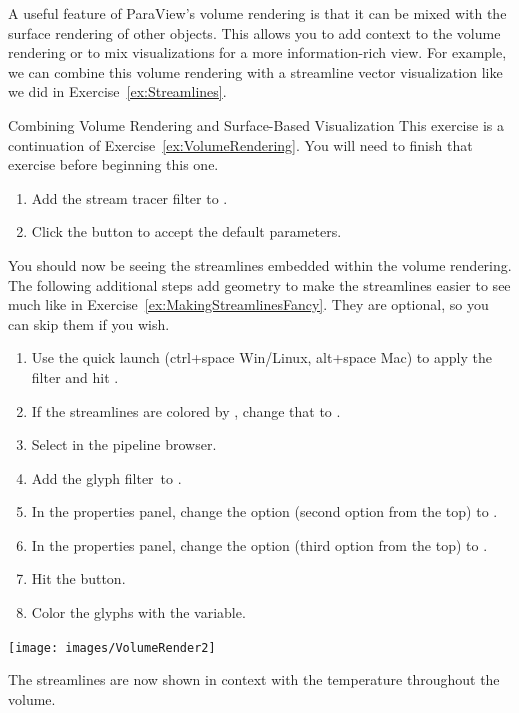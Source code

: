 A useful feature of ParaView's volume rendering is that it can be mixed
with the surface rendering of other objects.  This allows you to add
context to the volume rendering or to mix visualizations for a more
information-rich view.  For example, we can combine this volume rendering
with a streamline vector visualization like we did in
Exercise~\ref{ex:Streamlines}.

\begin{exercise}{Combining Volume Rendering and Surface-Based Visualization}
  \label{ex:CombiningVolumeAndSurfaceRendering}%
  This exercise is a continuation of Exercise~\ref{ex:VolumeRendering}.
  You will need to finish that exercise before beginning this one.

  \begin{enumerate}
  \item Add the stream tracer filter \streamTracer to
    .
  \item Click the \apply button to accept the default parameters.
    \savecounter
  \end{enumerate}

  You should now be seeing the streamlines embedded within the volume
  rendering.  The following additional steps add geometry to make the
  streamlines easier to see much like in
  Exercise~\ref{ex:MakingStreamlinesFancy}.  They are optional, so you can
  skip them if you wish.

  \begin{enumerate}
    \restorecounter
  \item Use the quick launch (ctrl+space Win/Linux, alt+space Mac) to apply
    the  filter and hit \apply.
  \item If the streamlines are colored by , change that to
    .
  \item Select  in the pipeline browser.
  \item Add the glyph filter~\glyph to .
  \item In the properties panel, change the  option (second
    option from the top) to .
  \item In the properties panel, change the  option (third
    option from the top) to .
  \item Hit the \apply button.
  \item Color the glyphs with the  variable.
  \end{enumerate}

  \begin{inlinefig}
    \texttt{[image: images/VolumeRender2]}
  \end{inlinefig}

  The streamlines are now shown in context with the temperature throughout
  the volume.
\end{exercise}

